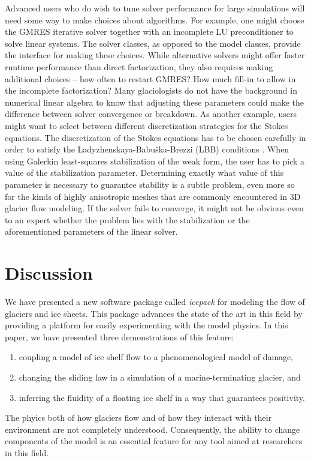 \documentclass{article}
\theoremstyle{definition}
\theoremstyle{plain}
\begin{document}
Advanced users who do wish to tune solver performance for large simulations will need some way to make choices about algorithms.
For example, one might choose the GMRES iterative solver together with an incomplete LU preconditioner to solve linear systems.
The solver classes, as opposed to the model classes, provide the interface for making these choices.
While alternative solvers might offer faster runtime performance than direct factorization, they also requires making additional choices -- how often to restart GMRES?
How much fill-in to allow in the incomplete factorization?
Many glaciologists do not have the background in numerical linear algebra to know that adjusting these parameters could make the difference between solver convergence or breakdown.
As another example, users might want to select between different discretization strategies for the Stokes equations.
The discretization of the Stokes equations has to be chosen carefully in order to satisfy the Ladyzhenskaya-Babu\v{s}ka-Brezzi (LBB) conditions \citep{boffi2013mixed}.
When using Galerkin least-squares stabilization of the weak form, the user has to pick a value of the stabilization parameter.
Determining exactly what value of this parameter is necessary to guarantee stability is a subtle problem, even more so for the kinds of highly anisotropic meshes that are commonly encountered in 3D glacier flow modeling.
If the solver fails to converge, it might not be obvious even to an expert whether the problem lies with the stabilization or the aforementioned parameters of the linear solver.


\section{Discussion}

We have presented a new software package called \emph{icepack} for modeling the flow of glaciers and ice sheets.
This package advances the state of the art in this field by providing a platform for easily experimenting with the model physics.
In this paper, we have presented three demonstrations of this feature:
\begin{enumerate}
    \item coupling a model of ice shelf flow to a phenomenological model of damage,
    \item changing the sliding law in a simulation of a marine-terminating glacier, and
    \item inferring the fluidity of a floating ice shelf in a way that guarantees positivity.
\end{enumerate}
The phyics both of how glaciers flow and of how they interact with their environment are not completely understood.
Consequently, the ability to change components of the model is an essential feature for any tool aimed at researchers in this field.
\end{document}
